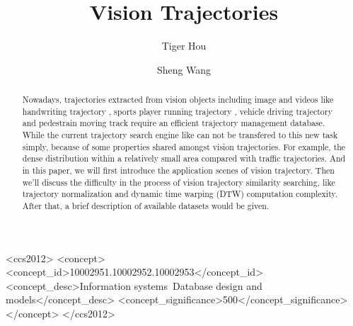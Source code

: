 \documentclass[sigconf]{acmart}
\begin{document}
\title{Vision Trajectories}




\author{Tiger Hou}

\author{Sheng Wang}


\begin{abstract}
Nowadays, trajectories extracted from vision objects including image and videos like handwriting trajectory \cite{VikramLR13, DBLP:conf/icdar/LiuYWW11}, sports player running trajectory \cite{DBLP:conf/kdd/WangLCJ19}, vehicle driving trajectory \cite{highDdataset} and pedestrain moving track \cite{GuptaJFSA18} require an efficient trajectory management database. While the current trajectory search engine like \cite{torch} can not be transfered to this new task simply, because of some properties shared amongst vision trajectories. For example, the dense distribution within a relatively small area compared with traffic trajectories. And in this paper, we will first introduce the application scenes of vision trajectory. Then we'll discuss the difficulty in the process of vision trajectory similarity searching, like trajectory normalization and dynamic time warping (DTW) computation complexity. After that, a brief description of available datasets would be given. 
\end{abstract}

\begin{CCSXML}
	<ccs2012>
	<concept>
	<concept_id>10002951.10002952.10002953</concept_id>
	<concept_desc>Information systems~Database design and models</concept_desc>
	<concept_significance>500</concept_significance>
	</concept>
	</ccs2012>
\end{CCSXML}
\end{document}
